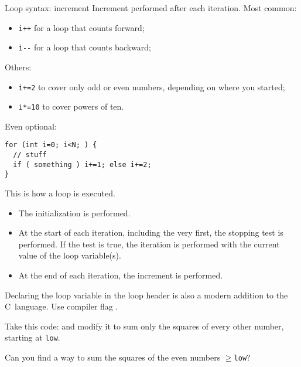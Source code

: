 \begin{block}{Loop syntax: increment}
  \label{sl:for-syntax3}
  Increment performed after each iteration. Most common:
  \begin{itemize}
  \item \lstinline{i++} for a loop that counts forward;
  \item \lstinline{i--} for a loop that counts backward;
  \end{itemize}
  Others:
  \begin{itemize}
  \item \lstinline{i+=2} to cover only odd or even numbers, depending on
    where you started;
  \item \lstinline{i*=10} to cover powers of ten.
  \end{itemize}
  Even optional:
\begin{lstlisting}
for (int i=0; i<N; ) {
  // stuff
  if ( something ) i+=1; else i+=2; 
}
\end{lstlisting}
\end{block}

This is how a loop is executed.
\begin{itemize}
\item The initialization is performed.
\item At the start of each iteration, including the very first, the
  stopping test is performed. If the test is true, the iteration is
  performed with the current value of the loop variable(s).
\item At the end of each iteration, the increment is performed.
\end{itemize}

\begin{cnote}
  Declaring the loop variable in the loop header is also a modern
  addition to the C~language.
  Use compiler flag .
\end{cnote}


\begin{exercise}
  \label{ex:sumevensquares}
  Take this code:
  and modify it to sum
  only the squares of every other number, starting at \lstinline{low}.

  Can you find a way to sum the squares of the even numbers $\geq$\lstinline{low}?
\end{exercise}

